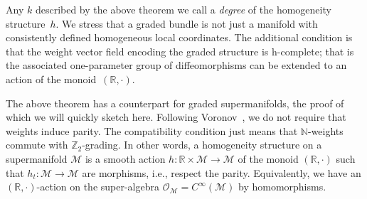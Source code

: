 \documentclass[10pt,a4paper]{amsart}
\numberwithin{equation}{section}
\begin{document}
Any $k$ described by the above theorem we call a \emph{degree} of the homogeneity structure~$h$. We stress that  a graded bundle is not just a manifold with consistently def\/ined homogeneous local coordinates. The additional condition is that the weight vector f\/ield encoding the graded structure is  h-complete; that is the associated one-parameter group of dif\/feomorphisms  can be extended to an action of the monoid~$(\mathbb{R}, \cdot)$.

\begin{Remark}
The above theorem has a counterpart for graded supermanifolds, the proof of which we will quickly sketch here. Following Voronov~\cite{Voronov:2001qf}, we do not require that weights induce parity. The compatibility condition just means that $\mathbb{N}$-weights commute with $\mathbb{Z}_2$-grading. In other words, a homogeneity structure on a supermanifold ${\mathcal M}$ is a smooth action $h\colon {\mathbb R}\times{\mathcal M}\to{\mathcal M}$ of the monoid $({\mathbb R},\cdot)$ such that $h_t\colon {\mathcal M}\to{\mathcal M}$ are morphisms, i.e., respect the parity. Equivalently, we have an $({\mathbb R},\cdot)$-action on
the super-algebra ${\mathcal O}_{\mathcal M}=C^\infty({\mathcal M})$ by homomorphisms.



\end{Remark}
\end{document}
